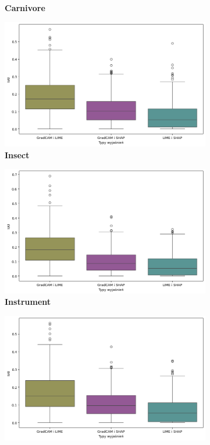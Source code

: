 \begin{figure}[h]
\begin{subfigure}[b]{0.3\textwidth}
		\caption{\textbf{Carnivore}}  \label{}
	\end{subfigure}
	\begin{subfigure}[b]{0.3\textwidth}
		\centering\includegraphics[width=.9\textwidth]{img/base_coherence_insect}
		\caption{\textbf{Insect}}  \label{}
	\end{subfigure}
	\begin{subfigure}[b]{0.3\textwidth}
		\centering\includegraphics[width=.9\textwidth]{img/base_coherence_music}
		\caption{\textbf{Instrument}}  \label{}
	\end{subfigure}
	\begin{subfigure}[b]{0.3\textwidth}
		\centering\includegraphics[width=.9\textwidth]{img/base_coherence_primate}

\end{subfigure}
\end{figure}
